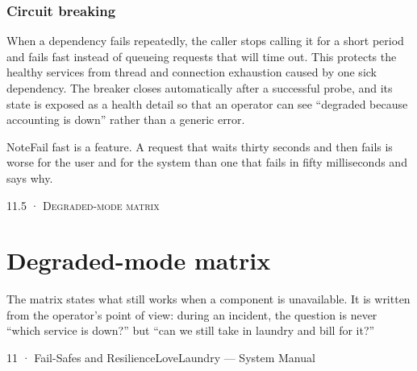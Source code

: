 \documentclass[11pt,a4paper,oneside]{book}
\begin{document}
\subsubsection*{Circuit breaking}
When a dependency fails repeatedly, the caller stops calling it for a short period and fails fast instead of queueing requests that will time out. This protects the healthy services from thread and connection exhaustion caused by one sick dependency. The breaker closes automatically after a successful probe, and its state is exposed as a health detail so that an operator can see “degraded because accounting is down” rather than a generic error.

\begin{notebox}NoteFail fast is a feature. A request that waits thirty seconds and then fails is worse for the user and for the system than one that fails in fifty milliseconds and says why.\end{notebox}
\textsc{\small\color{crimson}11.5 · Degraded-mode matrix}\par\medskip
\section*{Degraded-mode matrix}
The matrix states what still works when a component is unavailable. It is written from the operator's point of view: during an incident, the question is never “which service is down?” but “can we still take in laundry and bill for it?”

11 · Fail-Safes and ResilienceLoveLaundry — System Manual
\end{document}
